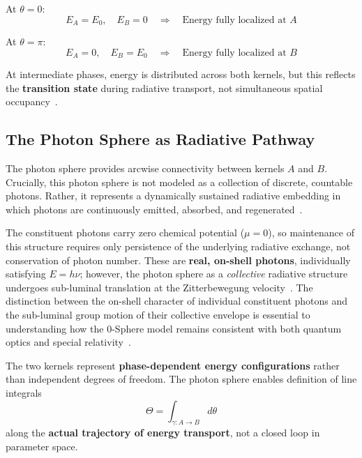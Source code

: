 \documentclass[12pt,letterpaper]{article}
\begin{document}
At $\theta = 0$:
\[
E_A = E_0, \quad E_B = 0 \quad \Rightarrow \quad \text{Energy fully localized at } A
\]

At $\theta = \pi$:
\[
E_A = 0, \quad E_B = E_0 \quad \Rightarrow \quad \text{Energy fully localized at } B
\]

At intermediate phases, energy is distributed across both kernels, but this reflects the \textbf{transition state} during radiative transport, not simultaneous spatial occupancy~\cite{hanamura18356895}.

\subsection{The Photon Sphere as Radiative Pathway}

The photon sphere provides arcwise connectivity between kernels $A$ and $B$. Crucially, this photon sphere is not modeled as a collection of discrete, countable photons. Rather, it represents a dynamically sustained radiative embedding in which photons are continuously emitted, absorbed, and regenerated~\cite{hanamura16759284}.

The constituent photons carry zero chemical potential ($\mu = 0$), so maintenance of this structure requires only persistence of the underlying radiative exchange, not conservation of photon number. These are \textbf{real, on-shell photons}, individually satisfying $E = h\nu$; however, the photon sphere as a \emph{collective} radiative structure undergoes sub-luminal translation at the Zitterbewegung velocity~\cite{hanamura18356895}. The distinction between the on-shell character of individual constituent photons and the sub-luminal group motion of their collective envelope is essential to understanding how the 0-Sphere model remains consistent with both quantum optics and special relativity~\cite{hanamura18511664}.

The two kernels represent \textbf{phase-dependent energy configurations} rather than independent degrees of freedom. The photon sphere enables definition of line integrals~\cite{hanamura18203433}
\begin{equation}
\Theta = \int_{\gamma: A \to B} d\theta
\end{equation}
along the \textbf{actual trajectory of energy transport}, not a closed loop in parameter space.

\end{document}
